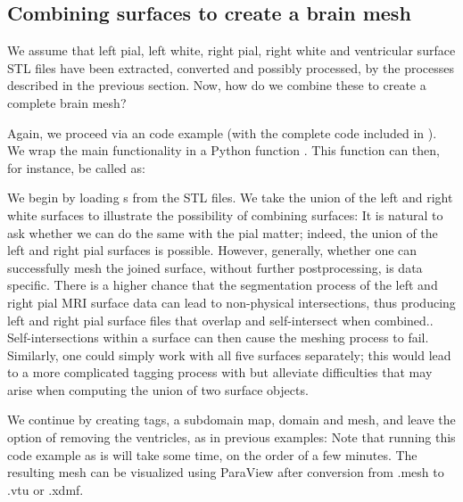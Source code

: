 \subsection{Combining surfaces to create a brain mesh}
We assume that left pial, left white, right pial, right white and
ventricular surface STL files have been extracted, converted and
possibly processed, by the processes described in the previous
section. Now, how do we combine these to create a complete brain mesh?

Again, we proceed via an \svmtk{} code example (with the complete
code included in ). We wrap
the main functionality in a Python function
. This function can then, for
instance, be called as:

We begin by loading s from the STL files. 
We take the union of the left and right white surfaces to illustrate
the possibility of combining surfaces:
It is natural to ask whether we can do the same with the pial matter;
indeed, the union of the left and right pial surfaces is
possible. However, generally, whether one can successfully mesh the
joined surface, without further postprocessing, is data specific.
There is a higher chance that the {\freesurfer} segmentation process
of the left and right pial MRI surface data can lead to non-physical
intersections, thus producing left and right pial surface files that
overlap and self-intersect when combined..  Self-intersections within
a surface can then cause the meshing process to fail. Similarly, one
could simply work with all five surfaces separately; this would lead
to a more complicated tagging process with  but
alleviate difficulties that may arise when computing the union of two
surface objects.

We continue by creating tags, a subdomain map, domain and mesh, and
leave the option of removing the ventricles, as in previous examples:
 Note that
running this code example as is will take some time, on the order of a
few minutes. The resulting mesh can be visualized using ParaView
after conversion from .mesh to .vtu or .xdmf.

